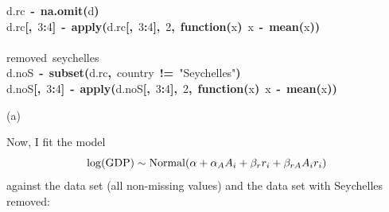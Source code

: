 \documentclass{article}
\makeatletter
\newcommand{\hlnumber}[1]{\textcolor[rgb]{0,0,0}{#1}}%
\newcommand{\hlfunctioncall}[1]{\textcolor[rgb]{.5,0,.33}{\textbf{#1}}}%
\newcommand{\hlstring}[1]{\textcolor[rgb]{.6,.6,1}{#1}}%
\newcommand{\hlkeyword}[1]{\textbf{#1}}%
\newcommand{\hlargument}[1]{\textcolor[rgb]{.69,.25,.02}{#1}}%
\newcommand{\hlcomment}[1]{\textcolor[rgb]{.18,.6,.34}{#1}}%
\newcommand{\hlformalargs}[1]{\hlargument{#1}}%
\newcommand{\hlassignement}[1]{\textbf{#1}}%
\newcommand{\hlsymbol}[1]{#1}%
\newcommand{\hlstd}[1]{\textcolor[rgb]{0,0,0}{#1}}%
\newenvironment{kframe}{%
 \def\FrameCommand##1{\hskip\@totalleftmargin \hskip-\fboxsep
 \colorbox{shadecolor}{##1}\hskip-\fboxsep
     \hskip-\linewidth \hskip-\@totalleftmargin \hskip\columnwidth}%
 \MakeFramed {\advance\hsize-\width
   \@totalleftmargin\z@ \linewidth\hsize
   \@setminipage}}%
 {\par\unskip\endMakeFramed}
\newenvironment{knitrout}{}{} %
\makeatother
\begin{document}
\begin{knitrout}
{\begin{kframe}
\begin{flushleft}
\hlstd{}\hlsymbol{d.rc}{\ }\hlassignement{\usebox{\hlnormalsizeboxlessthan}-}{\ }\hlfunctioncall{na.omit}\hlkeyword{(}\hlsymbol{d}\hlkeyword{)}\hspace*{\fill}\\
\hlstd{}\hlsymbol{d.rc}\hlkeyword{[}\hlkeyword{,}{\ }\hlnumber{3}\hlkeyword{:}\hlnumber{4}\hlkeyword{]}{\ }\hlassignement{\usebox{\hlnormalsizeboxlessthan}-}{\ }\hlfunctioncall{apply}\hlkeyword{(}\hlsymbol{d.rc}\hlkeyword{[}\hlkeyword{,}{\ }\hlnumber{3}\hlkeyword{:}\hlnumber{4}\hlkeyword{]}\hlkeyword{,}{\ }\hlnumber{2}\hlkeyword{,}{\ }\hlkeyword{function}\hlkeyword{(}\hlformalargs{x}\hlkeyword{)}{\ }\hlsymbol{x}{\ }\hlkeyword{-}{\ }\hlfunctioncall{mean}\hlkeyword{(}\hlsymbol{x}\hlkeyword{)}\hlkeyword{)}\hspace*{\fill}\\
\hlstd{}\hspace*{\fill}\\
\hlstd{}\hlcomment{\usebox{\hlnormalsizeboxhash}\usebox{\hlnormalsizeboxhash}{\ }removed{\ }seychelles}\hspace*{\fill}\\
\hlstd{}\hlsymbol{d.noS}{\ }\hlassignement{\usebox{\hlnormalsizeboxlessthan}-}{\ }\hlfunctioncall{subset}\hlkeyword{(}\hlsymbol{d.rc}\hlkeyword{,}{\ }\hlsymbol{country}{\ }\hlkeyword{!=}{\ }\hlstring{"Seychelles"}\hlkeyword{)}\hspace*{\fill}\\
\hlstd{}\hlsymbol{d.noS}\hlkeyword{[}\hlkeyword{,}{\ }\hlnumber{3}\hlkeyword{:}\hlnumber{4}\hlkeyword{]}{\ }\hlassignement{\usebox{\hlnormalsizeboxlessthan}-}{\ }\hlfunctioncall{apply}\hlkeyword{(}\hlsymbol{d.noS}\hlkeyword{[}\hlkeyword{,}{\ }\hlnumber{3}\hlkeyword{:}\hlnumber{4}\hlkeyword{]}\hlkeyword{,}{\ }\hlnumber{2}\hlkeyword{,}{\ }\hlkeyword{function}\hlkeyword{(}\hlformalargs{x}\hlkeyword{)}{\ }\hlsymbol{x}{\ }\hlkeyword{-}{\ }\hlfunctioncall{mean}\hlkeyword{(}\hlsymbol{x}\hlkeyword{)}\hlkeyword{)}\mbox{}
\normalfont
\end{flushleft}
\end{kframe}}
\end{knitrout}


(a) 

Now, I fit the model 
\[
\log ({\rm GDP}) \sim {\rm Normal} (\alpha + \alpha_A A_i + \beta_r r_i  + \beta_{rA} A_i r_i)
\]
against the data set (all non-missing values) and the data set with Seychelles removed:
\end{document}
